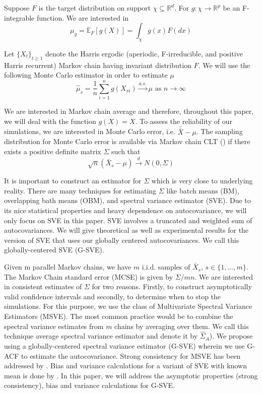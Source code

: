 \documentclass[11pt]{article}
\theoremstyle{remark}
\begin{document}
  Suppose $F$ is the target distribution on support $\chi \subseteq \mathbb{R}^d$. For $g:\chi \longrightarrow \mathbb{R}^p$ be an F-integrable function. We are interested in
%
\[
\mu_g = \mathbb{E}_F[g(X)] = \int_{\chi}g(x)F(dx)
\]
 
Let $\{X_{t}\}_{t \geq 1}$ denote the Harris ergodic (aperiodic, F-irreducible, and positive Harris recurrent) Markov chain having invariant distribution $F$. We will use the following Monte Carlo estimator in order to estimate $\mu$
%
\[
\hat{\mu}_s = \dfrac{1}{n}\sum_{i = 1}^{n} g(X_{si}) \xrightarrow{a.s.} \mu \textrm{ as } n \to \infty
\]

We are interested in Markov chain average and therefore, throughout this paper, we will deal with the function $g(X) = X$. To assess the reliability of our simulations, we are interested in Monte Carlo error, i.e. $\bar{\bar{X}} - \mu$. The sampling distribution for Monte Carlo error is available via Markov chain CLT (\cite{jones2004markov}) if there exists a positive definite matrix $\Sigma$ such that
%
\[
\sqrt{n}(\bar{X}_s-\mu) \xrightarrow{d} N(0,\Sigma)
\]

 It is important to construct an estimator for $\Sigma$ which is very close to underlying reality. There are many techniques for estimating $\Sigma$ like batch means (BM), overlapping bath means (OBM), and spectral variance estimator (SVE). Due to its nice statistical properties and heavy dependence on autocovariance, we will only focus on SVE in this paper. SVE involves a truncated and weighted sum of autocovariances. We will give theoretical as well as experimental results for the version of SVE that uses our globally centered autocovariances. We call this globally-centered SVE (G-SVE). 
 





Given m parallel Markov chains, we have $m$ i.i.d. samples of $\bar{X}_s$, $s \in \{1,..., m\}$. The Markov Chain standard error (MCSE) is given by $\Sigma/mn$. We are interested in consistent estimates of $\Sigma$ for two reasons. Firstly, to construct asymptotically valid confidence intervals and secondly, to determine when to stop the simulations. For this purpose, we use the class of Multivariate Spectral Variance Estimators (MSVE). The most common practice would be to combine the spectral variance estimates from $m$ chains by averaging over them. We call this technique average spectral variance estimator and denote it by $\hat{\Sigma}_A$). We propose using a globally-centered spectral variance estimator (G-SVE) wherein we use G-ACF to estimate the autocovariance. Strong consistency for MSVE has been addressed by \cite{vats:fleg:jon:2018}. Bias and variance calculations for a variant of SVE with known mean is done by \cite{hannan2009multiple}. In this paper, we will address the asymptotic properties (strong consistency), bias and variance calculations for G-SVE. 
\end{document}
